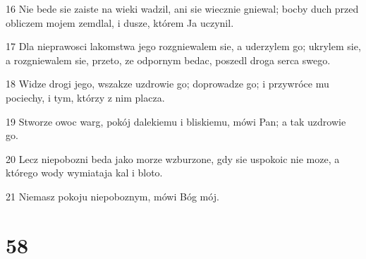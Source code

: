 \par 16 Nie bede sie zaiste na wieki wadzil, ani sie wiecznie gniewal; bocby duch przed obliczem mojem zemdlal, i dusze, którem Ja uczynil.
\par 17 Dla nieprawosci lakomstwa jego rozgniewalem sie, a uderzylem go; ukrylem sie, a rozgniewalem sie, przeto, ze odpornym bedac, poszedl droga serca swego.
\par 18 Widze drogi jego, wszakze uzdrowie go; doprowadze go; i przywróce mu pociechy, i tym, którzy z nim placza.
\par 19 Stworze owoc warg, pokój dalekiemu i bliskiemu, mówi Pan; a tak uzdrowie go.
\par 20 Lecz niepobozni beda jako morze wzburzone, gdy sie uspokoic nie moze, a którego wody wymiataja kal i bloto.
\par 21 Niemasz pokoju niepoboznym, mówi Bóg mój.

\chapter{58}

